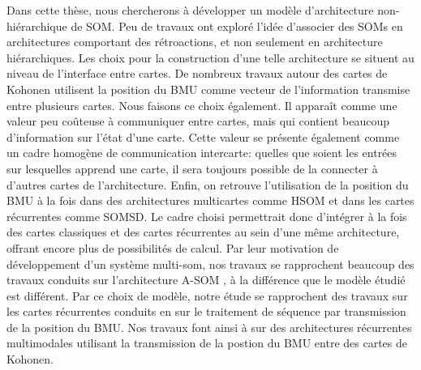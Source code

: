 \documentclass[../main]{subfiles}
\begin{document}
Dans cette thèse, nous chercherons à développer un modèle d'architecture non-hiérarchique de SOM. Peu de travaux ont exploré l'idée d'associer des SOMs en architectures comportant des rétroactions, et non seulement en architecture hiérarchiques.
Les choix pour la construction d'une telle architecture se situent au niveau de l'interface entre cartes. De nombreux travaux autour des cartes de Kohonen utilisent la position du BMU comme vecteur de l'information transmise entre plusieurs cartes. 
Nous faisons ce choix également. Il apparaît comme une valeur peu coûteuse à communiquer entre cartes, mais qui contient beaucoup d'information sur l'état d'une carte. Cette valeur se présente également comme un cadre homogène de communication intercarte: quelles que soient les entrées sur lesquelles apprend une carte, il sera toujours possible de la connecter à d'autres cartes de l'architecture. Enfin, on retrouve l'utilisation de la position du BMU à la fois dans des architectures multicartes comme HSOM et dans les cartes récurrentes comme SOMSD. Le cadre choisi permettrait donc d'intégrer à la fois des cartes classiques et des cartes récurrentes au sein d'une même architecture, offrant encore plus de possibilités de calcul. Par leur motivation de développement d'un système multi-som, nos travaux se rapprochent beaucoup des travaux conduits sur l'architecture A-SOM \cite{johnsson_associating_2008, johnsson_associative_2009,gil_sarasom_2015, Buonamente2015DiscriminatingAS}, à la différence que le modèle étudié est différent.
Par ce choix de modèle, notre étude se rapprochent des travaux sur les cartes récurrentes conduits en \cite{hagenbuchner_self-organizing_2003,Strickert2003UnsupervisedRS,fix20} sur le traitement de séquence par transmission de la position du BMU.
Nos travaux font ainsi à \cite{baheux_towards_2014} sur des architectures récurrentes multimodales utilisant la transmission de la postion du BMU entre des cartes de Kohonen. 
% 

\ifSubfilesClassLoaded{
    \printbibliography
}{}
\end{document}
